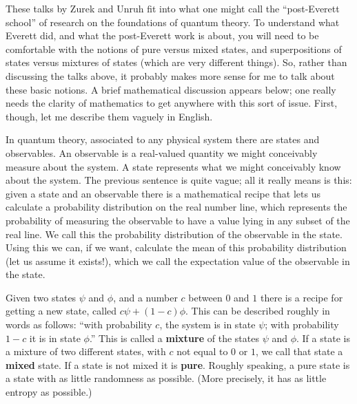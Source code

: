 \documentclass{article}
\begin{document}
These talks by Zurek and Unruh fit into what one might call the
``post-Everett school'' of research on the foundations of quantum
theory. To understand what Everett did, and what the post-Everett work
is about, you will need to be comfortable with the notions of pure
versus mixed states, and superpositions of states versus mixtures of
states (which are very different things). So, rather than discussing the
talks above, it probably makes more sense for me to talk about these
basic notions. A brief mathematical discussion appears below; one really
needs the clarity of mathematics to get anywhere with this sort of
issue. First, though, let me describe them vaguely in English.

In quantum theory, associated to any physical system there are states
and observables. An observable is a real-valued quantity we might
conceivably measure about the system. A state represents what we might
conceivably know about the system. The previous sentence is quite vague;
all it really means is this: given a state and an observable there is a
mathematical recipe that lets us calculate a probability distribution on
the real number line, which represents the probability of measuring the
observable to have a value lying in any subset of the real line. We call
this the probability distribution of the observable in the state. Using
this we can, if we want, calculate the mean of this probability
distribution (let us assume it exists!), which we call the expectation
value of the observable in the state.

Given two states \(\psi\) and \(\phi\), and a number \(c\) between \(0\)
and \(1\) there is a recipe for getting a new state, called
\(c \psi + (1-c)\phi\). This can be described roughly in words as
follows: ``with probability \(c\), the system is in state \(\psi\); with
probability \(1-c\) it is in state \(\phi\).'' This is called a
\textbf{mixture} of the states \(\psi\) and \(\phi\). If a state is a
mixture of two different states, with \(c\) not equal to \(0\) or \(1\),
we call that state a \textbf{mixed} state. If a state is not mixed it is
\textbf{pure}. Roughly speaking, a pure state is a state with as little
randomness as possible. (More precisely, it has as little entropy as
possible.)
\end{document}
